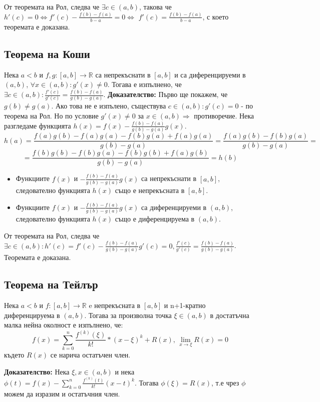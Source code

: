 \documentclass[fleqn,12pt]{article}
\begin{document}
От теоремата на Рол, следва че $\exists c \in (a,b)$, такова че  $h'(c) = 0 \Leftrightarrow f'(c) - \frac{f(b)-f(a)}{b-a} = 0 \Leftrightarrow$
$f'(c) = \frac{f(b)-f(a)}{b-a}$, с което теоремата е доказана.

\subsection{Теорема на Коши}
Нека $a<b$ и $f,g:[a,b]\rightarrow\mathbb{R}$ са непрекъснати в $[a,b]$ и са диференцируеми в $(a,b)$, $\forall x \in (a,b): g'(x) \neq 0$.
Тогава е изпълнено, че $\exists c \in (a,b): \frac{f'(c)}{g'(c)}=\frac{f(b)-f(a)}{g(b)-g(a)}$.
\bigbreak
\textbf{Доказателство:}
Първо ще покажем, че $g(b) \neq g(a)$. Ако това не е изпълено, съществува $c \in (a,b): g'(c) = 0$ - по теорема на Рол. Но по условие $g'(x) \neq 0$ за $x \in (a,b) \Rightarrow$ противоречие.
Нека разгледаме функцията $h(x)=f(x) - \frac{f(b)-f(a)}{g(b)-g(a)}g(x)$.
\[ h(a)=\frac{f(a)g(b) - f(a)g(a) - f(b)g(a) + f(a)g(a)}{g(b)-g(a)} = \frac{f(a)g(b)-f(b)g(a)}{g(b)-g(a)} =  \]
\[ = \frac{f(b)g(b) - f(b)g(a) - f(b)g(b) + f(a)g(b)}{g(b)-g(a)} = h(b) \]
\begin{itemize}
    \item Функциите $f(x)$ и $-\frac{f(b)-f(a)}{g(b)-g(a)}g(x)$ са непрекъснати в $[a,b]$, следователно функцията $h(x)$ също е непрекъсната в $[a,b]$.
    \item Функциите $f(x)$ и $-\frac{f(b)-f(a)}{g(b)-g(a)}g(x)$ са диференцируеми в $(a,b)$, следователно функцията $h(x)$ също е диференцируема в $(a,b)$.
\end{itemize}

От теоремата на Рол, следва че $\exists c \in (a,b): h'(c) = f'(c) - \frac{f(b)-f(a)}{g(b)-g(a)}g'(c) = 0, \frac{f'(c)}{g'(c)} = \frac{f(b)-f(a)}{g(b)-g(a)}$.
Теоремата е доказана.


\subsection{Теорема на Тейлър}
Нека $a<b$ и $f:[a,b]\rightarrow\mathbb{R}$ e непрекъсната в $[a,b]$ и n+1-кратно диференцируема в $(a,b)$. 
Тогава за произволна точка $\xi \in (a,b)$ в достатъчна малка нейна околност е изпълнено, че:
\[f(x)=\sum_{k = 0}^{n} \frac{f^{(k)}(\xi)}{k!}*(x-\xi)^k + R(x) \text{, } \lim_{x \rightarrow \xi} R(x) = 0\]
където $R(x)$ се нарича остатъчен член.

\textbf{Доказателство:}
Нека $\xi,x \in (a,b)$ и нека $\phi(t) = f(x) - \sum_{k = 0}^{n} \frac{f^{(k)}(t)}{k!}(x-t)^{k}$.
Тогава $\phi(\xi)=R(x)$, т.е чрез $\phi$ можем да изразим и остатъчния член.
\end{document}
